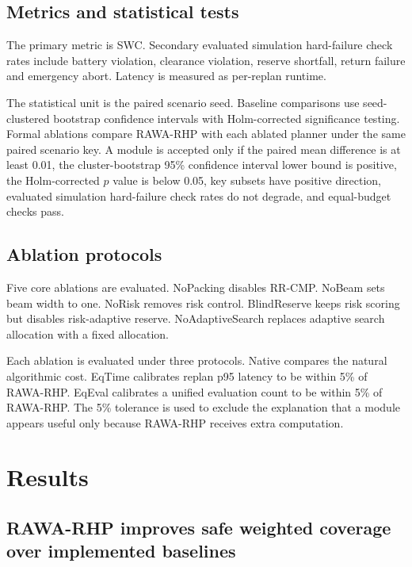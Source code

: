 \documentclass[preprint,12pt]{elsarticle}
\begin{document}


\FloatBarrier

\subsection{Metrics and statistical tests}

The primary metric is SWC. Secondary evaluated simulation hard-failure check rates include battery violation, clearance violation, reserve shortfall, return failure and emergency abort. Latency is measured as per-replan runtime.

The statistical unit is the paired scenario seed. Baseline comparisons use seed-clustered bootstrap confidence intervals with Holm-corrected significance testing. Formal ablations compare RAWA-RHP with each ablated planner under the same paired scenario key. A module is accepted only if the paired mean difference is at least 0.01, the cluster-bootstrap 95\% confidence interval lower bound is positive, the Holm-corrected $p$ value is below 0.05, key subsets have positive direction, evaluated simulation hard-failure check rates do not degrade, and equal-budget checks pass.

\subsection{Ablation protocols}

Five core ablations are evaluated. NoPacking disables RR-CMP. NoBeam sets beam width to one. NoRisk removes risk control. BlindReserve keeps risk scoring but disables risk-adaptive reserve. NoAdaptiveSearch replaces adaptive search allocation with a fixed allocation.

Each ablation is evaluated under three protocols. Native compares the natural algorithmic cost. EqTime calibrates replan p95 latency to be within 5\% of RAWA-RHP. EqEval calibrates a unified evaluation count to be within 5\% of RAWA-RHP. The 5\% tolerance is used to exclude the explanation that a module appears useful only because RAWA-RHP receives extra computation.

\section{Results}

\subsection{RAWA-RHP improves safe weighted coverage over implemented baselines}
\end{document}
